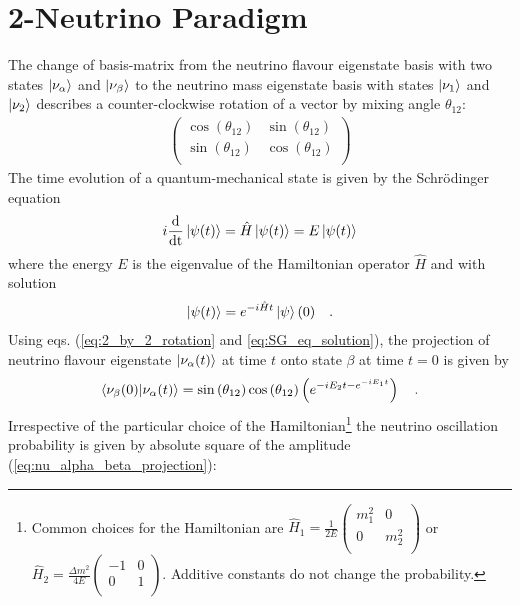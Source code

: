 \section{2-Neutrino Paradigm}
\label{sec:2-nu-paradigm}
The change of basis-matrix from the neutrino flavour eigenstate basis with two states $\ket{\nu_\alpha}$ and $\ket{\nu_\beta}$ to the neutrino mass eigenstate basis with states $\ket{\nu_1}$ and $\ket{\nu_2}$ describes a counter-clockwise rotation of a vector by mixing angle $\theta_{12}$:
%
\begin{align} \label{eq:2_by_2_rotation}
\begin{pmatrix}
    \cos(\theta_{12}) & \sin(\theta_{12}) \\
    \sin(\theta_{12}) & \cos(\theta_{12}) \\
\end{pmatrix}
\end{align}
%
The time evolution of a quantum-mechanical state is given by the Schr\"odinger equation
%
\begin{align} \label{eq:SG_eq}
    i \frac{\text{d}}{\text{dt}} \ket{\psi(t)} = \hat{H} \ket{\psi(t)} = E \ket{\psi(t)}
\end{align}
%
where the energy $E$ is the eigenvalue of the Hamiltonian operator $\hat{H}$ and with solution
%
\begin{align} \label{eq:SG_eq_solution}
    \ket{\psi(t)} = e^{-i \hat{H} t} \ket{\psi}(0) \quad \text{.}
\end{align}
%
Using eqs. (\ref{eq:2_by_2_rotation} and \ref{eq:SG_eq_solution}), the projection of neutrino flavour eigenstate $\ket{\nu_\alpha(t)}$ at time $t$ onto state $\beta$ at time $t=0$ is given by
%
\begin{align} \label{eq:nu_alpha_beta_projection}
    \braket{\nu_\beta(0)|\nu_\alpha(t)} = \sin{(\theta_{12})}\cos{(\theta_{12})} \left( e^{-iE_2t - e^{-i E_1t}} \right) \quad \text{.}
\end{align}
%
Irrespective of the particular choice of the Hamiltonian\footnote{Common choices for the Hamiltonian are $\hat{H}_1 = \frac{1}{2E}\begin{pmatrix}
    m^2_1 & 0 \\
    0 & m^2_2 \\
\end{pmatrix}$ or $\hat{H}_2 = \frac{\Delta m^2}{4E}\begin{pmatrix}
    -1 & 0 \\
    0 & 1 \\
\end{pmatrix}$. Additive constants do not change the probability.} the neutrino oscillation probability is given by absolute square of the amplitude (\ref{eq:nu_alpha_beta_projection}):
